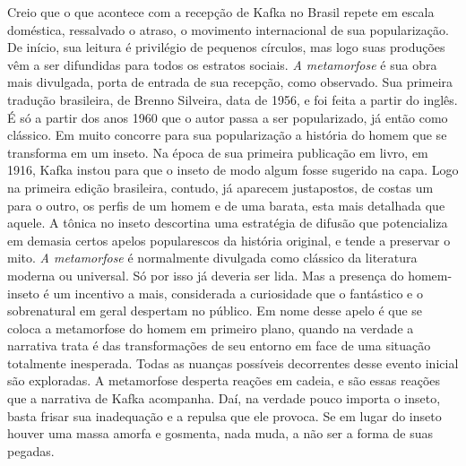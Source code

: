 Creio que o que acontece com a recepção de Kafka no Brasil repete em
escala doméstica, ressalvado o atraso, o movimento internacional de sua
popularização. De início, sua leitura é privilégio de pequenos círculos,
mas logo suas produções vêm a ser difundidas para todos os estratos
sociais. \textit{A metamorfose} é sua obra mais divulgada, porta de
entrada de sua recepção, como observado. Sua primeira tradução
brasileira, de Brenno Silveira, data de 1956, e foi feita a partir do inglês. É só
a partir dos anos 1960 que o autor passa a ser popularizado, já
então como clássico. Em muito concorre para sua popularização a
história do homem que se transforma em um inseto. Na época de sua
primeira publicação em livro, em 1916, Kafka instou para que o inseto
de modo algum fosse sugerido na capa. Logo na primeira edição
brasileira, contudo, já aparecem justapostos, de costas um para o
outro, os perfis de um homem e de uma barata, esta mais detalhada que
aquele. A tônica no inseto descortina uma estratégia de difusão que
potencializa em demasia certos apelos popularescos da história
original, e tende a preservar o mito. \textit{A metamorfose} é
normalmente divulgada como clássico da literatura moderna ou universal.
Só por isso já deveria ser lida. Mas a presença do homem-inseto é um
incentivo a mais, considerada a curiosidade que o fantástico e o
sobrenatural em geral despertam no público. Em nome desse apelo é que
se coloca a metamorfose do homem em primeiro plano, quando na verdade a
narrativa trata é das transformações de seu entorno em face de uma
situação totalmente inesperada. Todas as nuanças possíveis decorrentes
desse evento inicial são exploradas. A metamorfose desperta reações em
cadeia, e são essas reações que a narrativa de Kafka acompanha. Daí, na
verdade pouco importa o inseto, basta frisar sua inadequação e a
repulsa que ele provoca. Se em lugar do inseto houver uma massa amorfa
e gosmenta, nada muda, a não ser a forma de suas pegadas.


